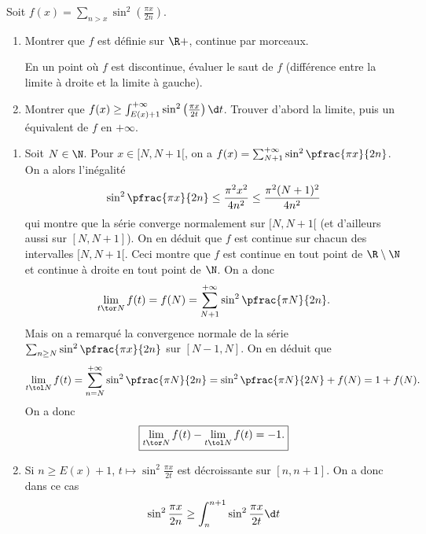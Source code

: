 \begin{enonce}
\begin{exercise}[ID={Cahier RMS 5, E109, Centrale},subtitle={},tags={}, difficulty={0}]
Soit $f(x)=\sum_{n>x}\sin^2\left( \frac{\pi x}{2n} \right) $.
\begin{enumerate}
\item Montrer que $f$ est définie sur $\R+$, continue par morceaux. 
    
    En un point où $f$ est discontinue, évaluer le saut de $f$ (différence entre la limite à droite et la limite à gauche).
\item Montrer que $f(x)\geq \int_{E(x)+1}^{+\infty} \sin^2\left( \frac{\pi x}{2t} \right) \d t$. Trouver d'abord la limite, puis un équivalent de $f$ en $+\infty$.
\end{enumerate}
\end{exercise}
\begin{solution}
\begin{enumerate}
\item Soit $N\in\N$. Pour $x\in[N,N+1[$, on a $f(x)=\sum_{N+1}^{+\infty}\sin^2\pfrac{\pi x}{2n}$. On a alors l'inégalité
\begin{equation*}
    \sin^2\pfrac{\pi x}{2n}\leq \frac{\pi^2 x^2}{4n^2}\leq \frac{\pi^2 (N+1)^2}{4n^2}
\end{equation*}
qui montre que la série converge normalement sur $[N,N+1[$ (et d'ailleurs aussi sur $[N,N+1]$). On en déduit que $f$ est continue sur chacun des intervalles $[N,N+1[$. Ceci montre que $f$ est continue en tout point de $\R\setminus\N$ et continue à droite en tout point de $\N$. On a donc
\begin{equation*}
    \lim_{t\tor N} f(t)=f(N)=\sum_{N+1}^{+\infty}\sin^2\pfrac{\pi N}{2n}.
\end{equation*}
Mais on a remarqué la convergence normale de la série $\sum_{n\geq N}\sin^2\pfrac{\pi x}{2n}$ sur $[N-1,N]$. On en déduit que
\begin{equation*}
    \lim_{t\tol N} f(t)=\sum_{n=N}^{+\infty}\sin^2\pfrac{\pi N}{2n} =\sin^2\pfrac{\pi N}{2N} + f(N)=1+f(N).
\end{equation*}
On a donc
\begin{equation*}
    \boxed{ \lim_{t\tor N} f(t) - \lim_{t\tol N} f(t) = -1.}
\end{equation*}
\item Si $n\geq E(x)+1$, $t\mapsto\sin^2\frac{\pi x}{2t}$ est décroissante sur $[n,n+1]$. On a donc dans ce cas
\begin{equation*}
    \sin^2\frac{\pi x}{2n} \geq \int_n^{n+1}\sin^2\frac{\pi x}{2t}\d t

\end{equation*}
\end{enumerate}
\end{solution}
\end{enonce}
